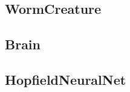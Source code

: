 \documentclass[titlepage, twocolumn, a4paper, 12pt, swedish]{article}
\begin{document}
\subsection{WormCreature}\label{app:WormCreature}
\begin{footnotesize}
  
\end{footnotesize}

\subsection{Brain}\label{app:Brain}
\begin{footnotesize}
  
\end{footnotesize}

\subsection{HopfieldNeuralNet}\label{app:HopfieldNeuralNet}
\begin{footnotesize}
  
\end{footnotesize}
\end{document}
